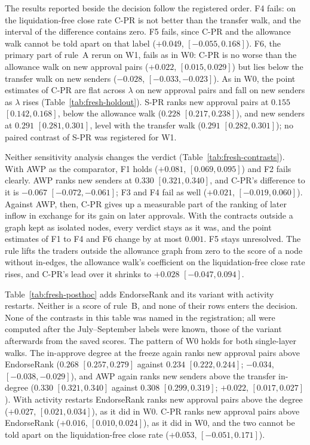 The results reported beside the decision follow the registered order. F4 fails: on the liquidation-free close rate C-PR is not better than the transfer walk, and the interval of the difference contains zero. F5 fails, since C-PR and the allowance walk cannot be told apart on that label ($+0.049$, $[-0.055,0.168]$). F6, the primary part of rule~A rerun on W1, fails as in W0: C-PR is no worse than the allowance walk on new approval pairs ($+0.022$, $[0.015,0.029]$) but lies below the transfer walk on new senders ($-0.028$, $[-0.033,-0.023]$). As in W0, the point estimates of C-PR are flat across $\lambda$ on new approval pairs and fall on new senders as $\lambda$ rises (Table~\ref{tab:fresh-holdout}). S-PR ranks new approval pairs at $0.155$ $[0.142,0.168]$, below the allowance walk ($0.228$ $[0.217,0.238]$), and new senders at $0.291$ $[0.281,0.301]$, level with the transfer walk ($0.291$ $[0.282,0.301]$); no paired contrast of S-PR was registered for W1.

Neither sensitivity analysis changes the verdict (Table~\ref{tab:fresh-contrasts}). With AWP as the comparator, F1 holds ($+0.081$, $[0.069,0.095]$) and F2 fails clearly. AWP ranks new senders at $0.330$ $[0.321,0.340]$, and C-PR's difference to it is $-0.067$ $[-0.072,-0.061]$; F3 and F4 fail as well ($+0.021$, $[-0.019,0.060]$). Against AWP, then, C-PR gives up a measurable part of the ranking of later inflow in exchange for its gain on later approvals. With the contracts outside a graph kept as isolated nodes, every verdict stays as it was, and the point estimates of F1 to F4 and F6 change by at most $0.001$. F5 stays unresolved. The rule lifts the traders outside the allowance graph from zero to the score of a node without in-edges, the allowance walk's coefficient on the liquidation-free close rate rises, and C-PR's lead over it shrinks to $+0.028$ $[-0.047,0.094]$.

Table~\ref{tab:fresh-posthoc} adds EndorseRank and its variant with activity restarts. Neither is a score of rule~B, and none of their rows enters the decision. None of the contrasts in this table was named in the registration; all were computed after the July--September labels were known, those of the variant afterwards from the saved scores. The pattern of W0 holds for both single-layer walks. The in-approve degree at the freeze again ranks new approval pairs above EndorseRank ($0.268$ $[0.257,0.279]$ against $0.234$ $[0.222,0.244]$; $-0.034$, $[-0.038,-0.029]$), and AWP again ranks new senders above the transfer in-degree ($0.330$ $[0.321,0.340]$ against $0.308$ $[0.299,0.319]$; $+0.022$, $[0.017,0.027]$). With activity restarts EndorseRank ranks new approval pairs above the degree ($+0.027$, $[0.021,0.034]$), as it did in W0. C-PR ranks new approval pairs above EndorseRank ($+0.016$, $[0.010,0.024]$), as it did in W0, and the two cannot be told apart on the liquidation-free close rate ($+0.053$, $[-0.051,0.171]$).

